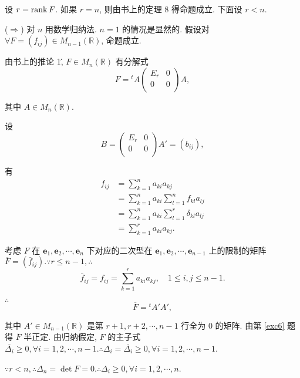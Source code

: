 \documentclass[color=black,device=normal,lang=cn,mode=geye]{elegantnote}
\begin{document}
\begin{solution}
    设 $r=\operatorname{rank} F$. 如果 $r=n$, 则由书上的定理 8 得命题成立. 下面设 $r<n$.

    ($\Rightarrow$) 对 $n$ 用数学归纳法. $n=1$ 的情况是显然的. 假设对 $\forall F=(f_{ij})\in M_{n-1}(\mathbb{R})$, 命题成立.
    
    由书上的推论 1\', $F\in M_n(\mathbb{R})$ 有分解式
    \[F={}^tA\begin{pmatrix}
        E_r & 0 \\
        0 & 0 \\
    \end{pmatrix}A,\]

    其中 $A\in M_n(\mathbb{R})$.
    
    设
    \[B=\begin{pmatrix}
        E_r & 0 \\
        0 & 0 \\
    \end{pmatrix}A'=(b_{ij}),\]
    
    有
    \begin{align*}
        f_{ij} & =\sum\limits_{k=1}^na_{ki}a_{kj} \\
        & =\sum\limits_{k=1}^na_{ki}\sum\limits_{l=1}^nf_{kl}a_{lj} \\
        & =\sum\limits_{k=1}^na_{ki}\sum\limits_{l=1}^r\delta_{kl}a_{lj} \\
        & =\sum\limits_{k=1}^ra_{ki}a_{kj}.
    \end{align*}

    考虑 $F$ 在 $\boldsymbol{e}_1,\boldsymbol{e}_2,\cdots,\boldsymbol{e}_n$ 下对应的二次型在 $\boldsymbol{e}_1,\boldsymbol{e}_2,\cdots,\boldsymbol{e}_{n-1}$ 上的限制的矩阵 $\overline{F}=(\bar{f}_{ij}).\because r\leq n-1,\therefore$
    \[\bar{f}_{ij}=f_{ij}=\sum\limits_{k=1}^ra_{ki}a_{kj},\quad1\leq i,j\leq n-1.\]

    $\therefore$
    \[\overline{F}={}^tA'A',\]

    其中 $A'\in M_{n-1}(\mathbb{R})$ 是第 $r+1,r+2,\cdots,n-1$ 行全为 $0$ 的矩阵. 由第 \ref{exc6} 题得 $\overline{F}$ 半正定. 由归纳假定, $F$ 的主子式 $\overline{\Delta_i}\geq0,\forall i=1,2,\cdots,n-1.\therefore\Delta_i=\overline{\Delta_i}\geq0,\forall i=1,2,\cdots,n-1$.

    $\because r<n,\therefore\Delta_n=\det F=0.\therefore\Delta_i\geq0,\forall i=1,2,\cdots,n$.

    

\end{solution}
\end{document}
